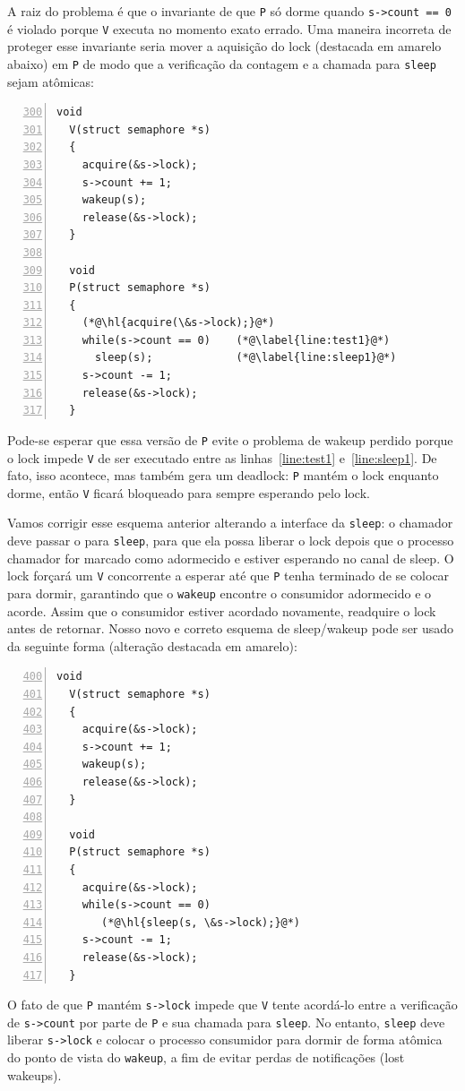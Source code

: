 A raiz do problema é que o invariante de que
\lstinline{P}
só dorme quando
\lstinline{s->count == 0}
é violado porque
\lstinline{V}
executa no momento exato errado.
Uma maneira incorreta de proteger esse invariante seria mover a aquisição do lock (destacada em amarelo abaixo) em
\lstinline{P}
de modo que a verificação da contagem e a chamada para
\lstinline{sleep}
sejam atômicas:
\begin{lstlisting}[numbers=left,firstnumber=300]
  void
  V(struct semaphore *s)
  {
    acquire(&s->lock);
    s->count += 1;
    wakeup(s);
    release(&s->lock);
  }
  
  void
  P(struct semaphore *s)
  {
    (*@\hl{acquire(\&s->lock);}@*)
    while(s->count == 0)    (*@\label{line:test1}@*)
      sleep(s);             (*@\label{line:sleep1}@*)
    s->count -= 1;
    release(&s->lock);
  }
\end{lstlisting}
Pode-se esperar que essa versão de
\lstinline{P}
evite o problema de wakeup perdido porque o lock impede
\lstinline{V}
de ser executado entre as linhas~\ref{line:test1} e~\ref{line:sleep1}.
De fato, isso acontece, mas também gera um deadlock:
\lstinline{P}
mantém o lock enquanto dorme, então
\lstinline{V}
ficará bloqueado para sempre esperando pelo lock.

Vamos corrigir esse esquema anterior alterando a interface da
\lstinline{sleep}:
o chamador deve passar o  para
\lstinline{sleep},
para que ela possa liberar o lock depois que o processo chamador for marcado como adormecido e estiver esperando no canal de sleep.
O lock forçará um
\lstinline{V}
concorrente a esperar até que
\lstinline{P}
tenha terminado de se colocar para dormir, garantindo que o
\lstinline{wakeup}
encontre o consumidor adormecido e o acorde.
Assim que o consumidor estiver acordado novamente,
readquire o lock antes de retornar.
Nosso novo e correto esquema de sleep/wakeup pode ser usado da seguinte forma (alteração destacada em amarelo):
\begin{lstlisting}[numbers=left,firstnumber=400]
  void
  V(struct semaphore *s)
  {
    acquire(&s->lock);
    s->count += 1;
    wakeup(s);
    release(&s->lock);
  }

  void
  P(struct semaphore *s)
  {
    acquire(&s->lock);
    while(s->count == 0)
       (*@\hl{sleep(s, \&s->lock);}@*)
    s->count -= 1;
    release(&s->lock);
  }
\end{lstlisting}
O fato de que
\lstinline{P}
mantém
\lstinline{s->lock}
impede que
\lstinline{V}
tente acordá-lo entre a verificação de
\lstinline{s->count}
por parte de
\lstinline{P}
e sua chamada para
\lstinline{sleep}.
No entanto,
\lstinline{sleep}
deve liberar
\lstinline{s->lock}
e colocar o processo consumidor para dormir
de forma atômica do ponto de vista do
\lstinline{wakeup},
a fim de evitar perdas de notificações (lost wakeups).
